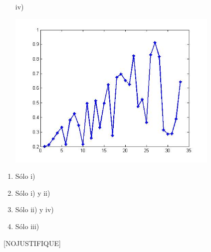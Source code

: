 \documentclass[11pt]{article}
\newcommand{\buena}{[BUENA]}
\newcommand{\nojustifique}{[NOJUSTIFIQUE]}
\begin{document}
\begin{itemize}
\begin{enumerate}
\begin{centering}
\end{centering}
\item[iv)]
\begin{centering}
\includegraphics[width=0.8\textwidth]{p4.jpg}
\end{centering}
\end{enumerate}
\begin{enumerate} 
\item\buena S\'olo i)
\item S\'olo i) y ii)
\item S\'olo ii) y iv)
\item S\'olo iii)
\end{enumerate}
\nojustifique 

\end{itemize}
\end{document}
